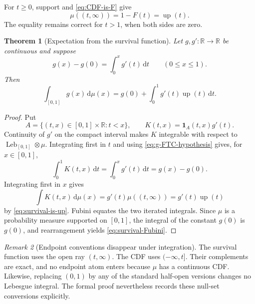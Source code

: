 \documentclass[11pt,oneside]{article}
\newtheorem{theorem}{Theorem}[section]
\theoremstyle{definition}
\theoremstyle{remark}
\newtheorem{remark}[theorem]{Remark}
\newcommand{\R}{\mathbb R}
\newcommand{\Up}{\operatorname{up}}
\newcommand{\dd}{\,\mathrm d}
\begin{document}
For $t\ge0$, support and \eqref{eq:CDF-is-F} give
\begin{equation}
 \mu((t,\infty))=1-F(t)=\Up(t).
 \label{eq:survival-is-up}
\end{equation}
The equality remains correct for $t>1$, when both sides are zero.

\begin{theorem}[Expectation from the survival function]
\label{thm:survival-Fubini}
Let $g,g':\R\to\R$ be continuous and suppose
\begin{equation}
 g(x)-g(0)=\int_0^x g'(t)\dd t
 \qquad(0\le x\le1).
 \label{eq:g-FTC-hypothesis}
\end{equation}
Then
\begin{equation}
 \int_{[0,1]}g(x)\dd\mu(x)
 =g(0)+\int_0^1 g'(t)\Up(t)\dd t.
 \label{eq:survival-Fubini}
\end{equation}
\end{theorem}

\begin{proof}
Put
\begin{equation}
 A=\{(t,x)\in[0,1]\times\R:t<x\},
 \qquad
 K(t,x)=\mathbf1_A(t,x)g'(t).
 \label{eq:Fubini-kernel}
\end{equation}
Continuity of $g'$ on the compact interval makes $K$ integrable with respect to
$\operatorname{Leb}_{[0,1]}\otimes\mu$.  Integrating first in $t$ and using
\eqref{eq:g-FTC-hypothesis} gives, for $x\in[0,1]$,
\begin{equation}
 \int_0^1K(t,x)\dd t=\int_0^xg'(t)\dd t=g(x)-g(0).
 \label{eq:Fubini-first-order}
\end{equation}
Integrating first in $x$ gives
\begin{equation}
 \int K(t,x)\dd\mu(x)=g'(t)\mu((t,\infty))=g'(t)\Up(t)
 \label{eq:Fubini-second-order}
\end{equation}
by \eqref{eq:survival-is-up}.  Fubini equates the two iterated integrals.  Since $\mu$ is a
probability measure supported on $[0,1]$, the integral of the constant $g(0)$ is $g(0)$,
and rearrangement yields \eqref{eq:survival-Fubini}.
\end{proof}

\begin{remark}[Endpoint conventions disappear under integration]
The survival function uses the open ray $(t,\infty)$.  The CDF uses $(-\infty,t]$.  Their
complements are exact, and no endpoint atom enters because $\mu$ has a continuous CDF.
Likewise, replacing $(0,1)$ by any of the standard half-open versions changes no Lebesgue
integral.  The formal proof nevertheless records these null-set conversions explicitly.
\end{remark}
\end{document}
